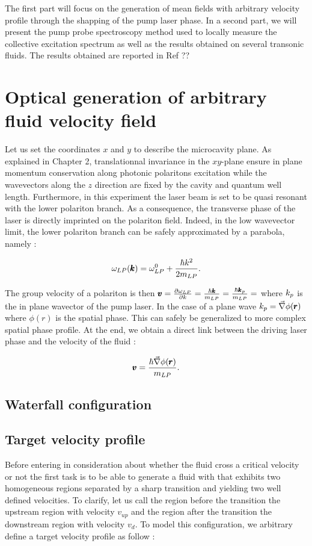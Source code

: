 The first part will focus on the generation of mean fields with arbitrary velocity profile through the shapping of the pump laser phase. In a second part, we will present the pump probe spectroscopy method used to locally measure the collective excitation spectrum as well
as the results obtained on several transonic fluids. The results obtained are reported in Ref ??


\section{Optical generation of arbitrary fluid velocity field}


Let us set the coordinates $x$ and $y$ to describe the microcavity plane. As explained in Chapter 2, translationnal invariance in the $xy$-plane ensure in plane momentum conservation along photonic polaritons excitation while the wavevectors along the
$z$ direction are fixed by the cavity and quantum well length. Furthermore, in this experiment the laser beam is set to be quasi resonant with the lower polariton branch. As a consequence, the transverse phase of the laser is directly imprinted on the polariton field.
Indeed, in the low wavevector limit, the lower polariton branch can be safely approximated by a parabola, namely :

\begin{equation}
    \omega_{LP}(\pmb{k}) = \omega_{LP}^0 + \dfrac{\hbar k^2}{2m_{LP}}.
\end{equation}

The group velocity of a polariton is then $\pmb{v} = \frac{\partial \omega_{LP}}{\partial k} = \frac{\hbar \pmb{k}}{m_{LP}}= \frac{\hbar \pmb{k}_p}{m_{LP}}=$ where $k_p$ is the in plane wavector of the pump laser.
In the case of a plane wave $k_p=\vec{\nabla}\phi(\pmb{r})$ where $\phi(r)$ is the spatial phase. This can safely be generalized to more complex spatial phase profile.
At the end, we obtain a direct link between the driving laser phase and the velocity of the fluid :

\begin{equation}
    \pmb{v} = \dfrac{\hbar \vec{\nabla} \phi(\pmb{r})}{m_{LP}} .
\end{equation}

\subsection{Waterfall configuration}


\subsection{Target velocity profile}
Before entering in consideration about whether the fluid cross a critical velocity or not the first task is to be able to generate a fluid with that exhibits two homogeneous regions separated by a sharp transition and yielding two well defined velocities. 
To clarify, let us call the region before the transition the upstream region with velocity $v_{up}$ and the region after the transition the downstream region with velocity $v_d$.
To model this configuration, we arbitrary define a target velocity profile as follow : 

